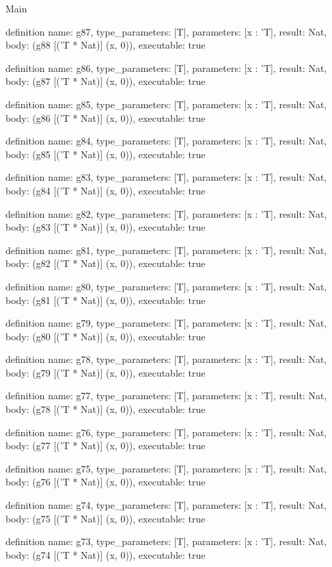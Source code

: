 \begin{lexlean}{Main}
\begin{semanticmodule}
definition{
  name: g87,
  type_parameters: [T],
  parameters: [x : 'T],
  result: Nat,
  body: (g88 [('T * Nat)] (x, 0)),
  executable: true
}

definition{
  name: g86,
  type_parameters: [T],
  parameters: [x : 'T],
  result: Nat,
  body: (g87 [('T * Nat)] (x, 0)),
  executable: true
}

definition{
  name: g85,
  type_parameters: [T],
  parameters: [x : 'T],
  result: Nat,
  body: (g86 [('T * Nat)] (x, 0)),
  executable: true
}

definition{
  name: g84,
  type_parameters: [T],
  parameters: [x : 'T],
  result: Nat,
  body: (g85 [('T * Nat)] (x, 0)),
  executable: true
}

definition{
  name: g83,
  type_parameters: [T],
  parameters: [x : 'T],
  result: Nat,
  body: (g84 [('T * Nat)] (x, 0)),
  executable: true
}

definition{
  name: g82,
  type_parameters: [T],
  parameters: [x : 'T],
  result: Nat,
  body: (g83 [('T * Nat)] (x, 0)),
  executable: true
}

definition{
  name: g81,
  type_parameters: [T],
  parameters: [x : 'T],
  result: Nat,
  body: (g82 [('T * Nat)] (x, 0)),
  executable: true
}

definition{
  name: g80,
  type_parameters: [T],
  parameters: [x : 'T],
  result: Nat,
  body: (g81 [('T * Nat)] (x, 0)),
  executable: true
}

definition{
  name: g79,
  type_parameters: [T],
  parameters: [x : 'T],
  result: Nat,
  body: (g80 [('T * Nat)] (x, 0)),
  executable: true
}

definition{
  name: g78,
  type_parameters: [T],
  parameters: [x : 'T],
  result: Nat,
  body: (g79 [('T * Nat)] (x, 0)),
  executable: true
}

definition{
  name: g77,
  type_parameters: [T],
  parameters: [x : 'T],
  result: Nat,
  body: (g78 [('T * Nat)] (x, 0)),
  executable: true
}

definition{
  name: g76,
  type_parameters: [T],
  parameters: [x : 'T],
  result: Nat,
  body: (g77 [('T * Nat)] (x, 0)),
  executable: true
}

definition{
  name: g75,
  type_parameters: [T],
  parameters: [x : 'T],
  result: Nat,
  body: (g76 [('T * Nat)] (x, 0)),
  executable: true
}

definition{
  name: g74,
  type_parameters: [T],
  parameters: [x : 'T],
  result: Nat,
  body: (g75 [('T * Nat)] (x, 0)),
  executable: true
}

definition{
  name: g73,
  type_parameters: [T],
  parameters: [x : 'T],
  result: Nat,
  body: (g74 [('T * Nat)] (x, 0)),
  executable: true
}


\end{semanticmodule}
\end{lexlean}
